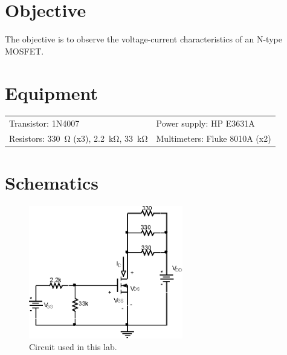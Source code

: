 

\section{Objective}
\label{sec:objective}

The objective is to observe the voltage-current characteristics of an N-type MOSFET.

\section{Equipment}
\label{sec:equipment}

\begin{tabular}{ll}
  \centering
  Transistor: 1N4007 & Power supply: HP E3631A \\
  Resistors: \SI{330}{\ohm} (x3), \SI{2.2}{\kilo\ohm}, \SI{33}{\kilo\ohm} & Multimeters: Fluke 8010A (x2) \\
\end{tabular}

\section{Schematics}
\label{sec:schematics}

\begin{figure}[hbtp]
  \centering
  \includegraphics[width=0.6\textwidth]{circuit}
  \caption{\label{fig:circuit} Circuit used in this lab.}
\end{figure}


